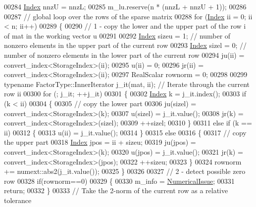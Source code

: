 \begin{DoxyCode}
00284   \hyperlink{namespace_eigen_a62e77e0933482dafde8fe197d9a2cfde}{Index} nnzU = nnzL;
00285   m\_lu.reserve(n * (nnzL + nnzU + 1));
00286 
00287   \textcolor{comment}{// global loop over the rows of the sparse matrix}
00288   \textcolor{keywordflow}{for} (\hyperlink{namespace_eigen_a62e77e0933482dafde8fe197d9a2cfde}{Index} ii = 0; ii < n; ii++)
00289   \{
00290     \textcolor{comment}{// 1 - copy the lower and the upper part of the row i of mat in the working vector u}
00291 
00292     \hyperlink{namespace_eigen_a62e77e0933482dafde8fe197d9a2cfde}{Index} sizeu = 1; \textcolor{comment}{// number of nonzero elements in the upper part of the current row}
00293     \hyperlink{namespace_eigen_a62e77e0933482dafde8fe197d9a2cfde}{Index} sizel = 0; \textcolor{comment}{// number of nonzero elements in the lower part of the current row}
00294     ju(ii)    = convert\_index<StorageIndex>(ii);
00295     u(ii)     = 0;
00296     jr(ii)    = convert\_index<StorageIndex>(ii);
00297     RealScalar rownorm = 0;
00298 
00299     \textcolor{keyword}{typename} FactorType::InnerIterator j\_it(mat, ii); \textcolor{comment}{// Iterate through the current row ii}
00300     \textcolor{keywordflow}{for} (; j\_it; ++j\_it)
00301     \{
00302       \hyperlink{namespace_eigen_a62e77e0933482dafde8fe197d9a2cfde}{Index} k = j\_it.index();
00303       \textcolor{keywordflow}{if} (k < ii)
00304       \{
00305         \textcolor{comment}{// copy the lower part}
00306         ju(sizel) = convert\_index<StorageIndex>(k);
00307         u(sizel) = j\_it.value();
00308         jr(k) = convert\_index<StorageIndex>(sizel);
00309         ++sizel;
00310       \}
00311       \textcolor{keywordflow}{else} \textcolor{keywordflow}{if} (k == ii)
00312       \{
00313         u(ii) = j\_it.value();
00314       \}
00315       \textcolor{keywordflow}{else}
00316       \{
00317         \textcolor{comment}{// copy the upper part}
00318         \hyperlink{namespace_eigen_a62e77e0933482dafde8fe197d9a2cfde}{Index} jpos = ii + sizeu;
00319         ju(jpos) = convert\_index<StorageIndex>(k);
00320         u(jpos) = j\_it.value();
00321         jr(k) = convert\_index<StorageIndex>(jpos);
00322         ++sizeu;
00323       \}
00324       rownorm += numext::abs2(j\_it.value());
00325     \}
00326 
00327     \textcolor{comment}{// 2 - detect possible zero row}
00328     \textcolor{keywordflow}{if}(rownorm==0)
00329     \{
00330       m\_info = \hyperlink{group__enums_gga85fad7b87587764e5cf6b513a9e0ee5eaaf9b736d310a664e7729d163a035cc5f}{NumericalIssue};
00331       \textcolor{keywordflow}{return};
00332     \}
00333     \textcolor{comment}{// Take the 2-norm of the current row as a relative tolerance}

\end{DoxyCode}
